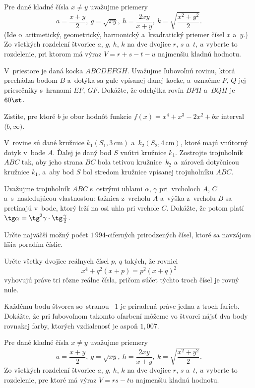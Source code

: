 ﻿{%
Pre dané kladné čísla $x\ne y$ uvažujme priemery
$$
a=\frac{x+y}2,\ g=\sqrt{xy},\ h=\frac{2xy}{x+y},\
k=\sqrt{\frac{x^2+y^2}2}.
$$
(Ide o~aritmetický, geometrický, harmonický a~kvadratický
priemer čísel $x$ a~$y$.)
Zo všetkých rozdelení štvorice $a$, $g$, $h$, $k$ na dve dvojice
$r$, $s$ a~$t$, $u$
vyberte to rozdelenie, pri ktorom má výraz $V=r+s-t-u$  najmenšiu
kladnú hodnotu.
}

{%
V~priestore je daná kocka $ABCDEFGH$. Uvažujme
ľubovoľnú rovinu, ktorá prechádza bodom $B$ a~dotýka sa gule
vpísanej danej kocke, a~označme $P$, $Q$ jej priesečníky s~hranami
$EF$, $GF$. Dokážte, že odchýlka rovín $BPH$ a~$BQH$ je $60\st$.
}

{%
Zistite, pre  ktoré $b$ je obor hodnôt funkcie
$f(x)=x^4+x^3-2x^2+bx$  interval $\langle b,\infty)$.
}

{%
V~rovine sú dané kružnice $k_1(S_1,3\,{\text{cm}})$
a~$k_2(S_2,4\,{\text{cm}})$, ktoré  majú vnútorný dotyk v~bode $A$.
Ďalej je daný bod $S$ vnútri kružnice $k_1$. Zostrojte trojuholník
$ABC$ tak, aby jeho strana $BC$ bola tetivou kružnice~$k_2$
a~zároveň dotyčnicou kružnice $k_1$, a~aby bod $S$ bol stredom kružnice
vpísanej trojuholníku $ABC$.
}

{%
Uvažujme trojuholník $ABC$ s~ostrými uhlami $\alpha$,  $\gamma$
pri~vrcholoch $A$, $C$ a~s~nasledujúcou vlastnosťou:  ťažnica z~vrcholu $A$
a~výška z~vrcholu $B$ sa pretínajú v~bode, ktorý leží na osi uhla
pri vrchole $C$. Dokážte, že potom platí  $\tg\alpha=\tg^2\gamma\cdot
\tg\frac{\gamma}2$.
}

{%
Určte najväčší možný počet $1\,994$-ciferných prirodzených čísel,
ktoré sa navzájom líšia poradím  číslic.
}

{%
Určte všetky dvojice reálnych čísel $p$, $q$ takých, že
rovnici
$$
 x^4 + q^2(x+p) = p^2(x+q)^2
$$
vyhovujú
práve tri rôzne reálne čísla, pričom súčet týchto troch čísel
je rovný nule.
}

{%
Každému bodu štvorca so~stranou~ $1$ je priradená práve jedna z
troch farieb. Dokážte, že pri ľubovoľnom takomto ofarbení môžeme
vo štvorci nájsť dva body rovnakej farby, ktorých vzdialenosť je
aspoň $1{,}007$.
}

{%
Pre dané kladné čísla $x\ne y$ uvažujme priemery
$$
a=\frac{x+y}2,\ g=\sqrt{xy},\ h=\frac{2xy}{x+y},\
k=\sqrt{\frac{x^2+y^2}2}.
$$
Zo všetkých rozdelení štvorice $a$, $g$, $h$, $k$ na dve
dvojice $r$, $s$ a~$t$, $u$ vyberte to rozdelenie, pre ktoré má
výraz $V = rs - tu$ najmenšiu kladnú hodnotu.
}

